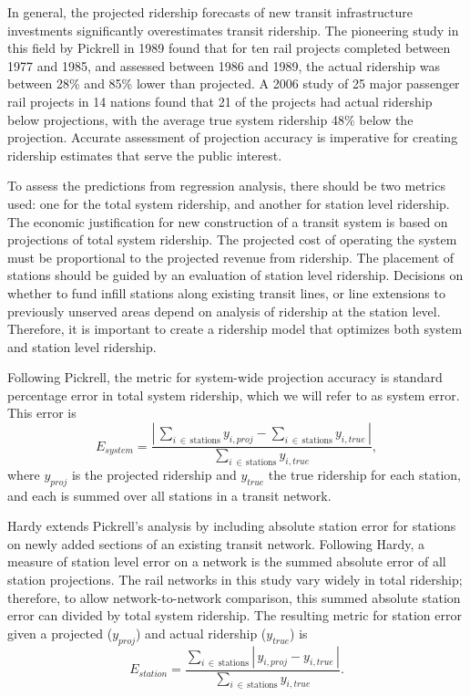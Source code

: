 \documentclass[11pt]{article}
\begin{document}
In general, the projected ridership forecasts of new transit infrastructure investments significantly overestimates transit ridership. The pioneering study in this field by Pickrell in 1989 \cite{Pickrell1989} found that for ten rail projects completed between 1977 and 1985, and assessed between 1986 and 1989, the actual ridership was between 28\% and 85\% lower than projected. A 2006 study \cite{Flyvbjerg2006} of 25 major passenger rail projects in 14 nations found that 21 of the projects had actual ridership below projections, with the average true system ridership 48\% below the projection. Accurate assessment of projection accuracy is imperative for creating ridership estimates that serve the public interest.

To assess the predictions from regression analysis, there should be two metrics used: one for the total system ridership, and another for station level ridership. The economic justification for new construction of a transit system is based on projections of total system ridership. The projected cost of operating the system must be proportional to the projected revenue from ridership. The placement of stations should be guided by an evaluation of station level ridership. Decisions on whether to fund infill stations along existing transit lines, or line extensions to previously unserved areas depend on analysis of ridership at the station level. Therefore, it is important to create a ridership model that optimizes both system and station level ridership. 

Following Pickrell, the metric for system-wide projection accuracy is standard percentage error in total system ridership, which we will refer to as system error. This error is
$$E_{system} = \dfrac{\left|\,\sum\limits_{i\,\in\,\text{stations}} y_{i, proj} - \sum\limits_{i\,\in\,\text{stations}} y_{i, true}\,\right|}{\sum\limits_{i\,\in\,\text{stations}} y_{i, true}},$$
where $y_{proj}$ is the projected ridership and $y_{true}$ the true ridership for each station, and each is summed over all stations in a transit network.

Hardy \cite{Hardy2010} extends Pickrell's analysis by including absolute station error for stations on newly added sections of an existing transit network. Following Hardy, a measure of station level error on a network is the summed absolute error of all station projections. The rail networks in this study vary widely in total ridership; therefore, to allow network-to-network comparison, this summed absolute station error can divided by total system ridership. The resulting metric for station error given a projected ($y_{proj}$) and actual ridership ($y_{true}$) is 
$$E_{station} = \dfrac{\sum\limits_{i\,\in\,\text{stations}}\left|\,y_{i, proj} - y_{i, true}\,\right|}{\sum\limits_{i\,\in\,\text{stations}} y_{i, true}}.$$
\end{document}

